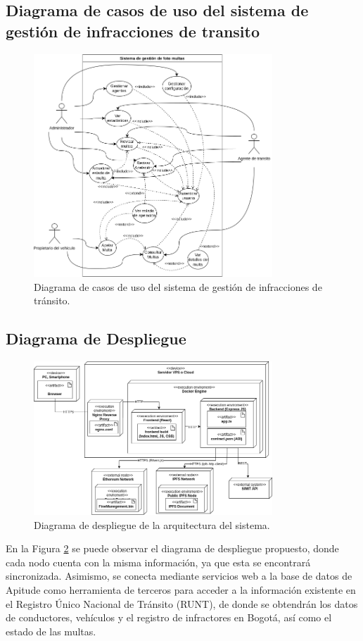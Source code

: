 \subsection{Diagrama de casos de uso del sistema de gestión de infracciones de transito }
\begin{figure}[htbp]
    \centering
    \includegraphics[width=0.8\textwidth]{Images/CasosUso.png}
    \caption{Diagrama de casos de uso del sistema de gestión de infracciones de tránsito.}
    \label{fig:casos_uso}
\end{figure}

 \subsection{ Diagrama de Despliegue }
\begin{figure}[htbp]
    \centering
    \includegraphics[width=0.8\textwidth]{Images/Despliegue.png}
    \caption{Diagrama de despliegue de la arquitectura del sistema.}
    \label{fig:diagrama_despliegue}
\end{figure}
En la Figura \ref{fig:diagrama_despliegue} se puede observar el diagrama de despliegue propuesto, donde cada nodo cuenta con la misma información, ya que esta se encontrará sincronizada. Asimismo, se conecta mediante servicios web a la base de datos de Apitude como herramienta de terceros para acceder a la información existente en el Registro Único Nacional de Tránsito (RUNT), de donde se obtendrán los datos de conductores, vehículos y el registro de infractores en Bogotá, así como el estado de las multas.

